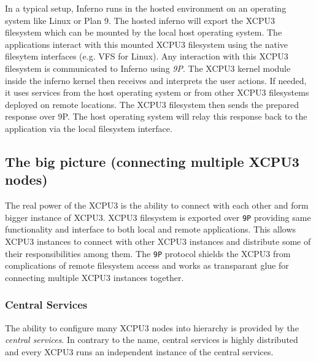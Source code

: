 \documentclass[conference]{IEEEtran}
\begin{document}
In a typical setup, Inferno runs in the hosted environment on an operating
system like Linux or Plan 9.  The hosted inferno will export the XCPU3
filesystem which can be mounted by the local host operating system. The 
applications interact with this mounted XCPU3 filesystem using the native
filesytem interfaces (e.g. VFS for Linux). Any interaction with this XCPU3
filesystem is communicated to Inferno using \textit{9P}. The XCPU3 kernel module
inside the inferno kernel then receives and interprets the user actions.  If
needed, it uses services from the host operating system or from other XCPU3
filesystems deployed on remote locations.  The XCPU3 filesystem then sends the
prepared response over 9P. The host operating system will relay this response
back to the application via the local filesystem interface.


\subsection{The big picture (connecting multiple XCPU3 nodes)}
The real power of the XCPU3 is the ability to connect with each other and form
bigger instance of XCPU3.  XCPU3 filesystem is exported over \texttt{9P}
providing same functionality and interface to both local and remote
applications.  This allows XCPU3 instances to connect with other XCPU3
instances and distribute some of their responsibilities among them.
The \texttt{9P} protocol shields the XCPU3 from complications of remote
filesystem access and works as transparant glue for connecting multiple XCPU3
instances together.

\subsubsection{Central Services}

The ability to configure many XCPU3 nodes into hierarchy is provided by the
\textit{central services}.  In contrary to the name, central services is
highly distributed and every XCPU3 runs an independent instance of the central
services.  
\end{document}
